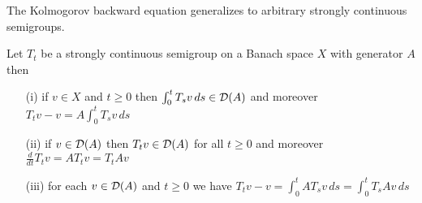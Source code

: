 The Kolmogorov backward equation generalizes to arbitrary strongly continuous semigroups.
\begin{prop}\label{StronglyContinuousSemigroupKolomgorovBackwardEquation}Let $T_t$ be a strongly continuous semigroup on a Banach  space $X$ with generator $A$ then 
\begin{itemize}
\item[(i)] if $v \in X$ and $t \geq 0$ then $\int_0^t T_s v \, ds \in \mathcal{D}(A)$ and moreover $T_t v - v = A \int_0^t T_sv \, ds$
\item[(ii)] if $v \in \mathcal{D}(A)$ then $T_t v \in \mathcal{D}(A)$ for all $t \geq 0$ and moreover $\frac{d}{dt} T_t v = A T_t v = T_t A v$
\item[(iii)] for each $v \in \mathcal{D}(A)$ and $t \geq 0$ we have $T_t v - v = \int_0^t A T_sv \, ds = \int_0^t T_s A v \, ds$
\end{itemize}
\end{prop}
